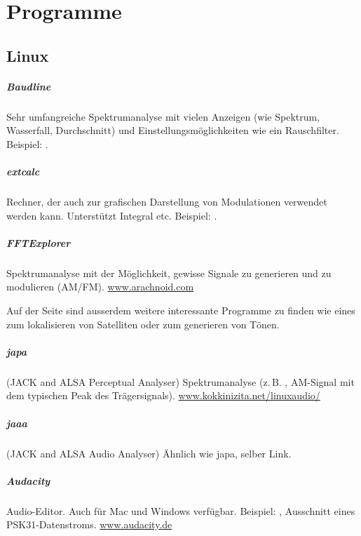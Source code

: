 \chapter{Programme}

\section{Linux}
\paragraph{Baudline} Sehr umfangreiche Spektrumanalyse mit vielen Anzeigen (wie Spektrum, Wasserfall, Durchschnitt) und Einstellungsmöglichkeiten wie ein Rauschfilter. Beispiel: .

\paragraph{extcalc} Rechner, der auch zur grafischen Darstellung von Modulationen verwendet werden kann. Unterstützt Integral etc. Beispiel: .

\paragraph{FFTExplorer} Spektrumanalyse mit der Möglichkeit, gewisse Signale zu generieren und zu modulieren (AM/FM). \href{http://www.arachnoid.com}{www.arachnoid.com}

Auf der Seite sind ausserdem weitere interessante Programme zu finden wie eines zum lokalisieren von Satelliten oder zum generieren von Tönen.

\paragraph{japa} (JACK and ALSA Perceptual Analyser) Spektrumanalyse (z.\,B. , AM-Signal mit dem typischen Peak des Trägersignals). \href{http://www.kokkinizita.net/linuxaudio/}{www.kokkinizita.net/linuxaudio/}

\paragraph{jaaa} (JACK and ALSA Audio Analyser) Ähnlich wie japa, selber Link.

\paragraph{Audacity} Audio-Editor. Auch für Mac und Windows verfügbar. Beispiel: , Ausschnitt eines PSK31-Datenstroms. \href{http://www.audacity.de}{www.audacity.de}

